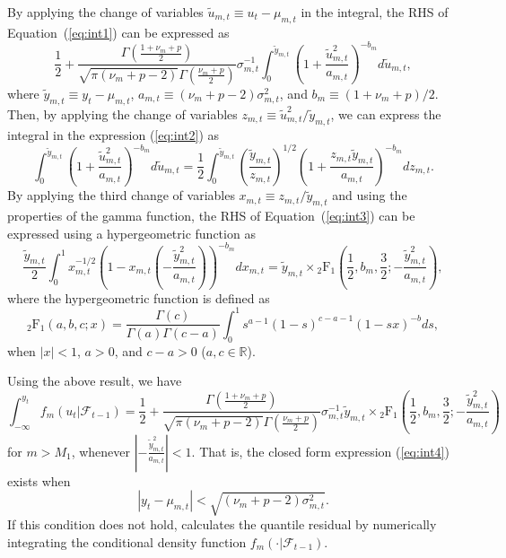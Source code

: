 \documentclass[nojss]{jss} %
\begin{document}
\begin{appendix}
By applying the change of variables $\tilde{u}_{m,t}\equiv u_t - \mu_{m,t}$ in the integral, the RHS of Equation~(\ref{eq:int1}) can be expressed as
%
\begin{equation}\label{eq:int2}
\frac{1}{2} + \frac{\Gamma\left(\frac{1 + \nu_m + p}{2}\right)}{\sqrt{\pi(\nu_m + p - 2)}\Gamma\left(\frac{\nu_m + p}{2}\right)}\sigma_{m,t}^{-1} \int_{0}^{\tilde{y}_{m,t}}\left(1 + \frac{\tilde{u}_{m,t}^2}{a_{m,t}} \right)^{-b_m} d \tilde{u}_{m,t},
\end{equation}
%
where $\tilde{y}_{m,t} \equiv y_t - \mu_{m,t}$, $a_{m,t}\equiv (\nu_m + p - 2)\sigma_{m,t}^2$, and $b_{m}\equiv (1 + \nu_m + p)/2$. Then, by applying the change of variables $z_{m,t}\equiv \tilde{u}_{m,t}^2/\tilde{y}_{m,t}$, we can express the integral in the expression (\ref{eq:int2}) as
%
\begin{equation}\label{eq:int3}
\int_{0}^{\tilde{y}_{m,t}}\left(1 + \frac{\tilde{u}_{m,t}^2}{a_{m,t}} \right)^{-b_m} d \tilde{u}_{m,t} = \frac{1}{2} \int_{0}^{\tilde{y}_{m,t}} \left(\frac{\tilde{y}_{m,t}}{z_{m,t}}\right)^{1/2}\left(1 + \frac{z_{m,t}\tilde{y}_{m,t}}{a_{m,t}}\right)^{-b_m}d z_{m,t}.
\end{equation}
%
By applying the third change of variables $x_{m,t}\equiv z_{m,t}/\tilde{y}_{m,t}$ and using the properties of the gamma function, the RHS of Equation~(\ref{eq:int3}) can be expressed using a hypergeometric function as
%
\begin{equation}
\frac{\tilde{y}_{m,t}}{2}\int_{0}^{1}x_{m,t}^{-1/2}\left(1-x_{m,t}\left(-\frac{\tilde{y}_{m,t}^2}{a_{m,t}} \right) \right)^{-b_{m}} dx_{m,t}=\tilde{y}_{m,t} \times {}_2\text{F}_1\left(\frac{1}{2},b_{m},\frac{3}{2};-\frac{\tilde{y}_{m,t}^2}{a_{m,t}} \right),
\end{equation}
%
where the hypergeometric function is defined as \citep[Section 1.3.1]{Aomoto+Kita:2011}
\begin{equation}
{}_2\text{F}_1\left(a,b,c;x \right) = \frac{\Gamma(c)}{\Gamma(a)\Gamma(c-a)}\int_{0}^{1}s^{a-1}(1-s)^{c-a-1}(1-sx)^{-b} ds,
\end{equation}
when $|x|<1$, $a>0$, and $c-a>0$ ($a,c\in\mathbb{R}$).

Using the above result, we have
\begin{equation}\label{eq:int4}
\int_{-\infty}^{y_t} f_m(u_t|\mathcal{F}_{t-1}) = \frac{1}{2} + \frac{\Gamma\left(\frac{1 + \nu_m + p}{2}\right)}{\sqrt{\pi(\nu_m + p - 2)}\Gamma\left(\frac{\nu_m + p}{2}\right)}\sigma_{m,t}^{-1} \tilde{y}_{m,t} \times {}_2\text{F}_1\left(\frac{1}{2},b_{m},\frac{3}{2};-\frac{\tilde{y}_{m,t}^2}{a_{m,t}}\right)
\end{equation}
for $m>M_1$, whenever $\left|-\frac{\tilde{y}_{m,t}^2}{a_{m,t}}\right|<1$. That is, the closed form expression (\ref{eq:int4}) exists when
\begin{equation}\label{eq:qrescond}
|y_t - \mu_{m,t}| < \sqrt{(\nu_m + p - 2)\sigma_{m,t}^2}.
\end{equation}
If this condition does not hold,  calculates the quantile residual by numerically integrating the conditional density function $f_m(\cdot|\mathcal{F}_{t-1})$.
\end{appendix}

\end{document}
